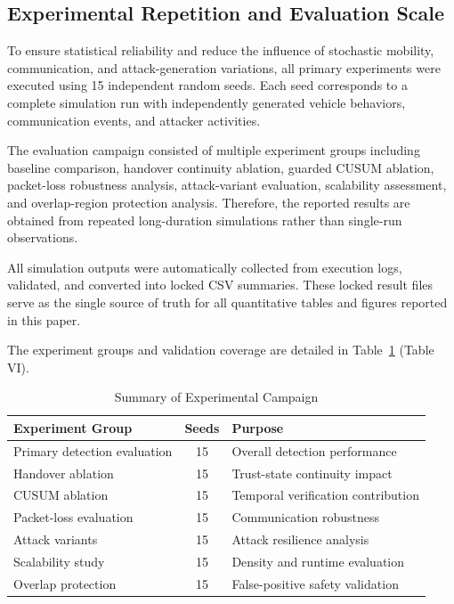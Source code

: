 \documentclass[journal]{IEEEtran}
\begin{document}
\subsection{Experimental Repetition and Evaluation Scale}
\label{subsec:experiment_scale}

To ensure statistical reliability and reduce the influence of stochastic
mobility, communication, and attack-generation variations, all primary
experiments were executed using 15 independent random seeds. Each seed
corresponds to a complete simulation run with independently generated
vehicle behaviors, communication events, and attacker activities.

The evaluation campaign consisted of multiple experiment groups including
baseline comparison, handover continuity ablation, guarded CUSUM ablation,
packet-loss robustness analysis, attack-variant evaluation, scalability
assessment, and overlap-region protection analysis. Therefore, the
reported results are obtained from repeated long-duration simulations
rather than single-run observations.

All simulation outputs were automatically collected from execution logs,
validated, and converted into locked CSV summaries. These locked result
files serve as the single source of truth for all quantitative tables
and figures reported in this paper.

The experiment groups and validation coverage are detailed in
Table~\ref{tab:experiment_summary} (Table VI).

\begin{table}[!t]
\caption{Summary of Experimental Campaign}
\label{tab:experiment_summary}
\centering
\begin{tabularx}{\columnwidth}{@{}>{\raggedright\arraybackslash}p{} c X@{}}
\toprule
\textbf{Experiment Group} & \textbf{Seeds} & \textbf{Purpose}\\
\midrule
Primary detection evaluation & 15 & Overall detection performance\\
Handover ablation & 15 & Trust-state continuity impact\\
CUSUM ablation & 15 & Temporal verification contribution\\
Packet-loss evaluation & 15 & Communication robustness\\
Attack variants & 15 & Attack resilience analysis\\
Scalability study & 15 & Density and runtime evaluation\\
Overlap protection & 15 & False-positive safety validation\\
\bottomrule
\end{tabularx}
\end{table}
\end{document}
